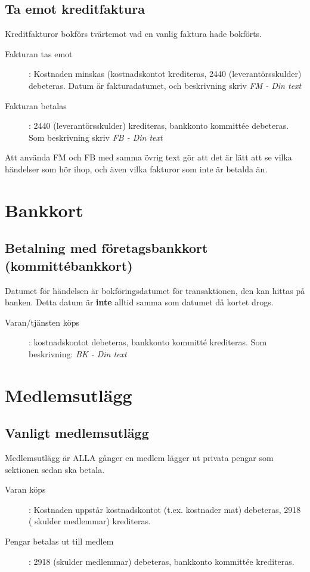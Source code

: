 \documentclass{article}
\begin{document}
\subsection{Ta emot kreditfaktura}
Kreditfakturor bokförs tvärtemot vad en vanlig faktura hade bokförts.
\begin{description}
    \item [Fakturan tas emot]: Kostnaden minskas (kostnadskontot krediteras, 2440 (leverantörsskulder) debeteras. Datum är fakturadatumet, och beskrivning skriv \textit{FM - Din text}
    \item [Fakturan betalas]: 2440 (leverantörsskulder) krediteras, bankkonto kommittée debeteras. Som beskrivning skriv \textit{FB - Din text}
\end{description}
Att använda FM och FB med samma övrig text gör att det är lätt att se vilka händelser som hör ihop, och även vilka fakturor som inte är betalda än.


\section{Bankkort}
\subsection{Betalning med företagsbankkort (kommittébankkort)}
Datumet för händelsen är bokföringsdatumet för transaktionen, den kan hittas på banken. Detta datum är \textbf{inte} alltid samma som datumet då kortet drogs.

\begin{description}
    \item  [Varan/tjänsten köps]: kostnadskontot debeteras, bankkonto kommitté krediteras. Som beskrivning: \textit{BK - Din text}
\end{description}

\section{Medlemsutlägg}
\subsection{Vanligt medlemsutlägg}
Medlemsutlägg är ALLA gånger en medlem lägger ut privata pengar som sektionen sedan ska betala. 
\begin{description}
    \item [Varan köps]: Kostnaden uppstår kostnadskontot (t.ex. kostnader mat) debeteras, 2918 ( skulder medlemmar) krediteras.
    \item [Pengar betalas ut till medlem]: 2918 (skulder medlemmar) debeteras, bankkonto kommittée krediteras.
\end{description}
\end{document}
